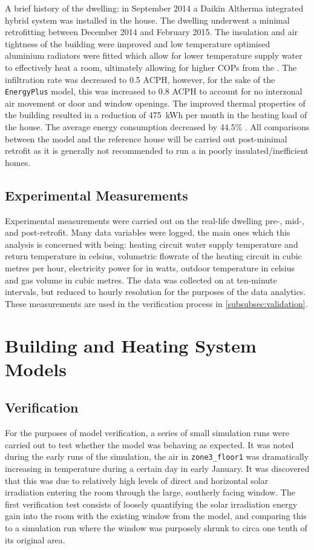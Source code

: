 A brief history of the dwelling: in September 2014 a Daikin Altherma integrated hybrid \HP system was installed in the house. The dwelling underwent a minimal retrofitting between December 2014 and February 2015. The insulation and air tightness of the building were improved and low temperature optimised aluminium radiators were fitted which allow for lower temperature supply water to effectively heat a room, ultimately allowing for higher \acp{COP} from the \HP. The infiltration rate was decreased to 0.5 \ac{ACPH}, however, for the sake of the \texttt{EnergyPlus} model, this was increased to 0.8 \ac{ACPH} to account for no interzonal air movement or door and window openings. The improved thermal properties of the building resulted in a reduction of \qty{475}{\kWh} per month in the heating load of the house. The average energy consumption decreased by 44.5\% \cite{keogh_technical_2018}. All comparisons between the model and the reference house will be carried out post-minimal retrofit as it is generally not recommended to run a \HP in poorly insulated/inefficient homes.

\subsection{Experimental Measurements} \label{subsec:expmeasure}
Experimental measurements were carried out on the real-life dwelling pre-, mid-, and post-retrofit. Many data variables were logged, the main ones which this analysis is concerned with being: heating circuit water supply temperature and return temperature in celsius, volumetric flowrate of the heating circuit in cubic metres per hour, electricity power for \HP in watts, outdoor temperature in celsius and gas volume in cubic metres. The data was collected on at ten-minute intervals, but reduced to hourly resolution for the purposes of the data analytics. These measurements are used in the verification process in \cref{subsubsec:validation}.


\section{Building and Heating System Models}\label{sec:methodheatingsys}



\subsection{Verification} \label{subsubsec:verification}
For the purposes of model verification, a series of small simulation runs were carried out to test whether the model was behaving as expected. It was noted during the early runs of the simulation, the air in \texttt{zone3\_floor1} was dramatically increasing in temperature during a certain day in early January. It was discovered that this was due to relatively high levels of direct and horizontal solar irradiation entering the room through the large, southerly facing window. The first verification test consists of loosely quantifying the solar irradiation energy gain into the room with the existing window from the model, and comparing this to a simulation run where the window was purposely shrunk to circa one tenth of its original area. 

